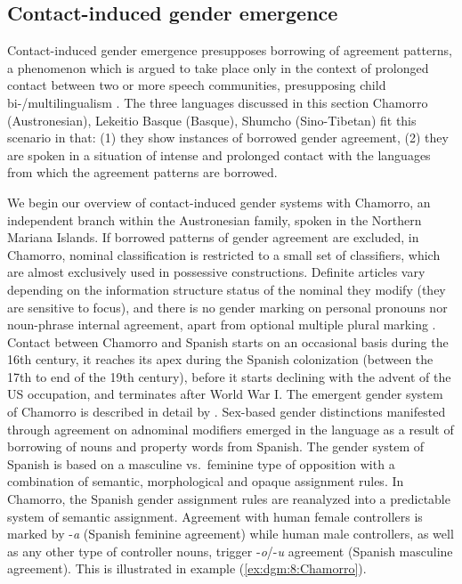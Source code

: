 \documentclass[output=collectionpaper]{langsci/langscibook}
\begin{document}
\subsection{Contact-induced gender emergence}
Contact-induced gender emergence presupposes borrowing of agreement patterns, a phenomenon which is argued to take place only in the context of prolonged contact between two or more speech communities, presupposing child bi-/multilingualism \citep{Thomason1992,Thomason2001,Trudgill2011}. The three languages discussed in this section \textendash{} Chamorro (Austronesian), Lekeitio Basque (Basque), Shumcho (Sino-Tibetan) \textendash{} fit this scenario in that: (1) they show instances of borrowed gender agreement, (2) they are spoken in a situation of intense and prolonged contact with the languages from which the agreement patterns are borrowed.


We begin our overview of contact-induced gender systems with Chamorro, an independent branch within the Austronesian family, spoken in the Northern Mariana Islands. If borrowed patterns of gender agreement are excluded, in  Chamorro, nominal classification is restricted to a small set of classifiers, which are almost exclusively used in possessive constructions. Definite articles vary depending on the information structure status of the nominal they modify (they are sensitive to focus), and there is no gender marking on personal pronouns nor noun-phrase internal agreement, apart from optional multiple plural marking \citep[111]{Stolz2012}. Contact between Chamorro and Spanish starts on an occasional basis during the 16th century, it reaches its apex during the Spanish colonization (between the 17th to end of the 19th century), before it starts declining with the advent of the US occupation, and terminates after World War I. The emergent gender system of Chamorro is described in detail by \citet{Stolz2012}. Sex-based gender distinctions manifested through agreement on adnominal modifiers emerged in the language as a result of borrowing of nouns and property words from Spanish. The gender system of Spanish is based on a masculine vs.\ feminine type of opposition with a combination of semantic, morphological and opaque assignment rules. In Chamorro, the Spanish gender assignment rules are reanalyzed into a predictable system of semantic assignment. Agreement with human female controllers is marked by -\textit{a} (Spanish feminine agreement)  while human male controllers, as well as any other type of controller nouns, trigger  -\textit{o}/-\textit{u} agreement (Spanish masculine agreement). This is illustrated in example (\ref{ex:dgm:8:Chamorro}).
\end{document}
